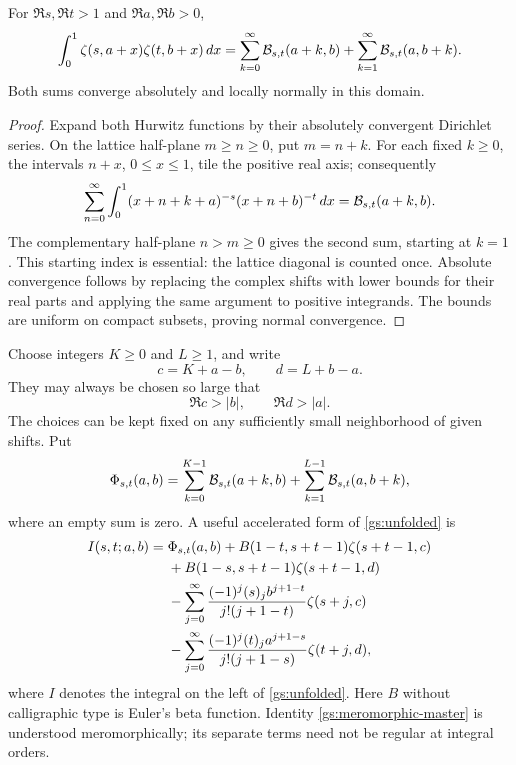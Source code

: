 \begin{theorem}\label{gs:unfolding}
For $\Re s,\Re t>1$ and $\Re a,\Re b>0$,
\begin{equation}\label{gs:unfolded}
 \int_0^1\zeta(s,a+x)\zeta(t,b+x)\,dx
 =\sum_{k=0}^\infty\mathcal B_{s,t}(a+k,b)
  +\sum_{k=1}^\infty\mathcal B_{s,t}(a,b+k).
\end{equation}
Both sums converge absolutely and locally normally in this domain.
\end{theorem}

\begin{proof}
Expand both Hurwitz functions by their absolutely convergent Dirichlet
series.  On the lattice half-plane $m\ge n\ge0$, put $m=n+k$.
For each fixed $k\ge0$, the intervals $n+x$, $0\le x\le1$, tile the
positive real axis; consequently
\[
 \sum_{n=0}^\infty\int_0^1
 (x+n+k+a)^{-s}(x+n+b)^{-t}\,dx
 =\mathcal B_{s,t}(a+k,b).
\]
The complementary half-plane $n>m\ge0$ gives the second sum, starting
at $k=1$.  This starting index is essential: the lattice diagonal is
counted once.  Absolute convergence follows by replacing the complex
shifts with lower bounds for their real parts and applying the same
argument to positive integrands.  The bounds are uniform on compact
subsets, proving normal convergence.
\end{proof}

Choose integers $K\ge0$ and $L\ge1$, and write
\begin{equation}\label{gs:cd}
 c=K+a-b,\qquad d=L+b-a.
\end{equation}
They may always be chosen so large that
\begin{equation}\label{gs:cutoff-condition}
 \Re c>|b|,\qquad \Re d>|a|.
\end{equation}
The choices can be kept fixed on any sufficiently small neighborhood
of given shifts.  Put
\begin{equation}\label{gs:finite-prefix}
 \Phi_{s,t}(a,b)=
 \sum_{k=0}^{K-1}\mathcal B_{s,t}(a+k,b)
 +\sum_{k=1}^{L-1}\mathcal B_{s,t}(a,b+k),
\end{equation}
where an empty sum is zero.  A useful accelerated form of
\eqref{gs:unfolded} is
\begin{align}
 I(s,t;a,b)={}&\Phi_{s,t}(a,b)
 +B(1-t,s+t-1)\zeta(s+t-1,c)\notag\\
 &+B(1-s,s+t-1)\zeta(s+t-1,d)\notag\\
 &-\sum_{j=0}^\infty
 \frac{(-1)^j(s)_j b^{j+1-t}}{j!(j+1-t)}\zeta(s+j,c)\notag\\
 &-\sum_{j=0}^\infty
 \frac{(-1)^j(t)_j a^{j+1-s}}{j!(j+1-s)}\zeta(t+j,d),
 \label{gs:meromorphic-master}
\end{align}
where $I$ denotes the integral on the left of \eqref{gs:unfolded}.
Here $B$ without calligraphic type is Euler's beta function.
Identity \eqref{gs:meromorphic-master} is understood meromorphically;
its separate terms need not be regular at integral orders.

